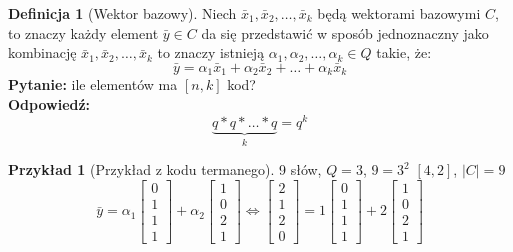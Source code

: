 \documentclass[a4paper,12pt]{article}
\theoremstyle{definition}%
\newtheorem{example}{Przykład}
\newtheorem*{example*}{Przykład} %
\theoremstyle{definition}
\newtheorem{definition}{Definicja}%
\theoremstyle{problem}
\begin{document}
\begin{definition}[Wektor bazowy]
Niech $\bar{x}_1,\bar{x}_2,\dots ,\bar{x}_k$ będą wektorami bazowymi $C$, to znaczy każdy element $\bar{y}\in C$ da się przedstawić w sposób jednoznaczny jako kombinację $\bar{x}_1,\bar{x}_2,\dots ,\bar{x}_k$ to znaczy istnieją $\alpha _1,\alpha _2,\dots ,\alpha _k \in Q$ takie, że:
$$\bar{y}=\alpha _1\bar{x}_1+\alpha _2\bar{x}_2+\dots +\alpha _k\bar{x}_k$$
\textbf{Pytanie:} ile elementów ma $[n,k]$ kod?\\
\textbf{Odpowiedź:} $$\underbrace{q*q*\dots *q}_k=q^k$$
\end{definition}
\begin{example*}[Przykład z kodu termanego]
9 słów, $Q=3$, $9=3^2$ $[4,2]$, $|C|=9$
$$\bar{y}=\alpha _1\begin{bmatrix}
0\\1\\1\\1
\end{bmatrix}+\alpha _2\begin{bmatrix}
1\\0\\2\\1
\end{bmatrix}\Leftrightarrow \begin{bmatrix}
2\\1\\2\\0
\end{bmatrix}=1\begin{bmatrix}
0\\1\\1\\1
\end{bmatrix}+2\begin{bmatrix}
1\\0\\2\\1
\end{bmatrix}$$
\end{example*}
\end{document}
